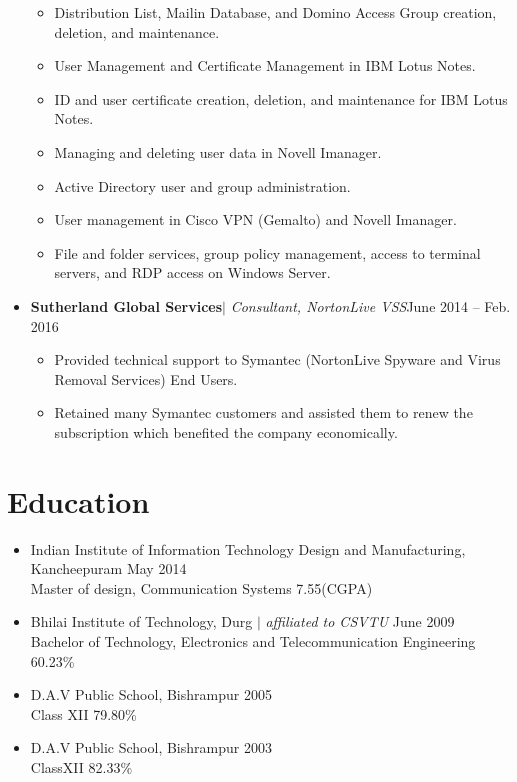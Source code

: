 \documentclass[letterpaper, 12pt]{article}
\begin{document}
\begin{itemize}[noitemsep]
				\vspace*{-0.6cm}
				\begin{itemize}[noitemsep]
					\item{Distribution List, Mailin Database, and Domino Access Group creation, deletion, and maintenance.}
					\item {User Management and Certificate Management in IBM Lotus Notes.}
					\item {ID and user certificate creation, deletion, and maintenance for IBM Lotus Notes.}
					\item {Managing and deleting user data in Novell Imanager.}
					\item {Active Directory user and group administration.}
					\item {User management in Cisco VPN (Gemalto) and Novell Imanager.}
					\item {File and folder services, group policy management, access to terminal servers, and RDP access on Windows Server.}	
				\end{itemize}
				\vspace*{-0.1cm}
				\item {\textbf{Sutherland Global Services}$|$ \textit{Consultant, NortonLive VSS}\hfill{June 2014 -- Feb. 2016}}\\
				\vspace*{-0.6cm}
				\begin{itemize}[noitemsep]
					\item {Provided technical support to Symantec (NortonLive Spyware and Virus Removal Services) End Users.}
					\item {Retained many Symantec customers and assisted them to renew the subscription which benefited the company economically.}
					
				\end{itemize}
		\end{itemize}  

	\section{Education}
		\begin{itemize}[noitemsep]
			\item {{Indian Institute of Information Technology Design and Manufacturing, Kancheepuram} \hfill {May 2014}\\{Master of design, Communication Systems} \hfill {7.55(CGPA)}} 
			\item {Bhilai Institute of Technology, Durg $|$ \textit{affiliated to CSVTU}} \hfill {June 2009}\\{Bachelor of Technology, Electronics and Telecommunication Engineering} \hfill {60.23\%}
			\item  {{D.A.V Public School, Bishrampur} \hfill {2005}\\{Class XII} \hfill {79.80\%}}
			\item {{D.A.V Public School, Bishrampur} \hfill {2003}\\ {ClassXII} \hfill {82.33\%}}		
		
		\end{itemize}
	
\end{document}
